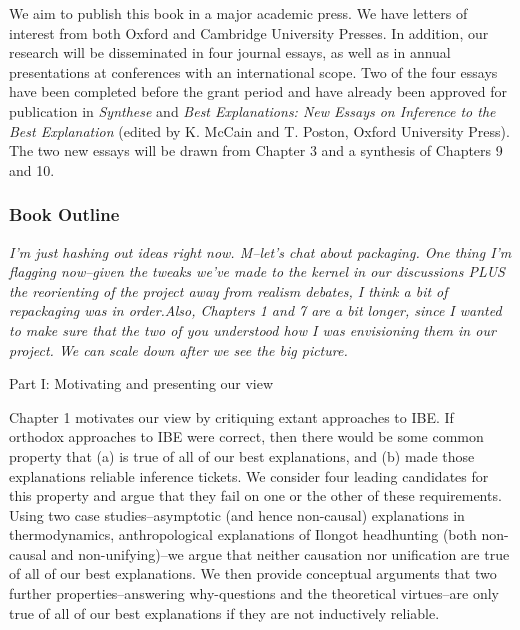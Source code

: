 \documentclass{article}[11pt]
\begin{document}




We aim to publish this book in a major academic press. We have letters of interest from both Oxford and Cambridge University Presses. In addition, our research will be disseminated in four journal essays, as well as in annual presentations at conferences with an international scope. Two of the four essays have been completed before the grant period and have already been approved for publication in \textit{Synthese} and \textit{Best Explanations: New Essays on Inference to the Best Explanation} (edited by K. McCain and T. Poston, Oxford University Press). The two new essays will be drawn from Chapter 3 and a synthesis of Chapters 9 and 10.
\subsubsection*{Book Outline}

\textit{I'm just hashing out ideas right now. M--let's chat about packaging. One thing I'm flagging now--given the tweaks we've made to the kernel in our discussions PLUS the reorienting of the project away from realism debates, I think a bit of repackaging was in order.Also, Chapters 1 and 7 are a bit longer, since I wanted to make sure that the two of you understood how I was envisioning them in our project. We can scale down after we see the big picture.}

Part I: Motivating and presenting our view

Chapter 1 motivates our view by critiquing extant approaches to IBE. If orthodox approaches to IBE were correct, then there would be  some common property that (a) is true of all of our best explanations, and (b) made those explanations reliable inference tickets. We consider four leading candidates for this property and argue that they fail on one or the other of these requirements. Using two case studies--asymptotic (and hence non-causal) explanations in thermodynamics, anthropological explanations of Ilongot headhunting (both non-causal and non-unifying)--we argue that neither causation nor unification are true of all of our best explanations. We then provide conceptual arguments that two further properties--answering why-questions and the theoretical virtues--are only true of all of our best explanations if they are not inductively reliable. 
\end{document}
